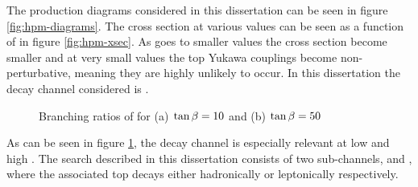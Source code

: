 	The production diagrams considered in this dissertation can be seen in figure \ref{fig:hpm-diagrams}. The cross section at various \tanb values can be seen as a function of \mHpm in figure \ref{fig:hpm-xsec}. As \tanb goes to smaller values the \Hpm cross section become smaller and at very small values the top Yukawa couplings become non-perturbative, meaning they are highly unlikely to occur. In this dissertation the decay channel considered is \HpmLong. 
	\begin{figure}[!h]
		\centering
		\caption{\label{fig:hpm-br} Branching ratios of \Hpm for (a) $\tan\beta = 10$ and (b) $\tan\beta = 50$ ~\cite{Heinemeyer:2013tqa} }
	\end{figure}
	As can be seen in figure \ref{fig:hpm-br}, the \HpmLong decay channel is especially relevant at low \mHpm and high \tanb. The search described in this dissertation consists of two sub-channels, \taujets and \taulep, where the associated top decays either hadronically or leptonically respectively. 

